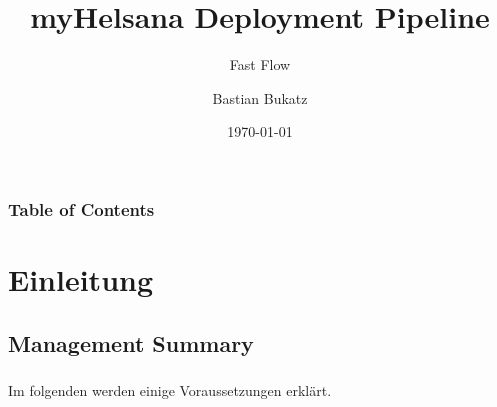 \documentclass[aspectratio=169]{beamer}
\title{myHelsana Deployment Pipeline}
\subtitle{Fast Flow}
\author{Bastian Bukatz}
\institute{Innovation Process Technology}
\date{\today}
\begin{document}
\begin{frame}
\titlepage
\end{frame}



\begin{frame}
\frametitle{Table of Contents}
\tableofcontents
\end{frame}


\section{Einleitung}
\subsection{Management Summary}
\begin{frame}
\frametitle{\subsecname}\framesubtitle{\secname}
Im folgenden werden einige Voraussetzungen erklärt.
\end{frame}
\end{document}
